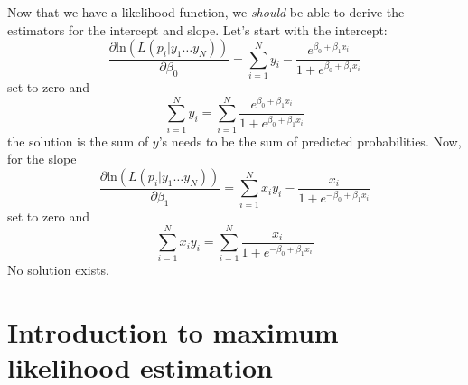 Now that we have a likelihood function, we {\it should} be able to derive the estimators for the intercept and slope. Let's start with the intercept:
\begin{equation}
\frac{\partial\mbox{ln}\left(L\left(p_i \vert y_1 \ldots y_N\right)\right)}{\partial\beta_0}=\sum_{i=1}^Ny_i-\frac{e^{\beta_0+\beta_1x_i}}{1+e^{\beta_0+\beta_1x_i}}
\end{equation}
set to zero and
\begin{equation}
\sum_{i=1}^Ny_i=\sum_{i=1}^N\frac{e^{\beta_0+\beta_1x_i}}{1+e^{\beta_0+\beta_1x_i}}
\end{equation}
the solution is the sum of $y$'s needs to be the sum of predicted probabilities. Now, for the slope
\begin{equation}
\frac{\partial\mbox{ln}\left(L\left(p_i \vert y_1 \ldots y_N\right)\right)}{\partial\beta_1}=\sum_{i=1}^Nx_iy_i-\frac{x_i}{1+e^{-\beta_0+\beta_1x_i}}
\end{equation}
set to zero and
\begin{equation}
\sum_{i=1}^Nx_iy_i=\sum_{i=1}^N\frac{x_i}{1+e^{-\beta_0+\beta_1x_i}}
\end{equation}
No solution exists.

\section{Introduction to maximum likelihood estimation}

